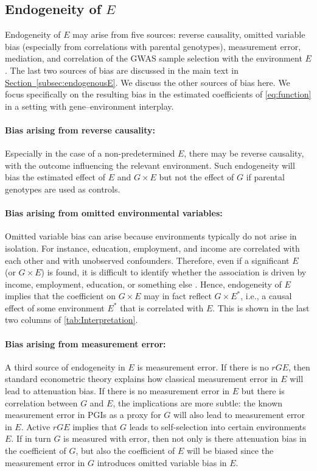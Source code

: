 \documentclass[12pt,a4paper]{article}
\begin{document}
\begin{bibunit}
\subsection{Endogeneity of \texorpdfstring{$E$}{}}
Endogeneity of $E$ may arise from five sources: reverse causality, omitted variable bias (especially from correlations with parental genotypes), measurement error, mediation, and correlation of the GWAS sample selection with the environment $E$. The last two sources of bias are discussed in the main text in \hyperref[subsec:endogenousE]{Section~\ref*{subsec:endogenousE}}. We discuss the other sources of bias here. We focus specifically on the resulting bias in the estimated coefficients of \autoref{eq:function} in a setting with gene--environment interplay. 

\paragraph{Bias arising from reverse causality:}
Especially in the case of a non-predetermined $E$, there may be reverse causality, with the outcome influencing the relevant environment. Such endogeneity will bias the estimated effect of $E$ and $G \times E$ but not the effect of $G$ if parental genotypes are used as controls. 

\paragraph{Bias arising from omitted environmental variables:}
Omitted variable bias can arise because environments typically do not arise in isolation. For instance, education, employment, and income are correlated with each other and with unobserved confounders. Therefore, even if a significant $E$ (or $G \times E$) is found, it is difficult to identify whether the association is driven by income, employment, education, or something else  \citep{Boardman2013}. Hence, endogeneity of $E$ implies that the coefficient on $G \times E$ may in fact reflect $G \times E^*$, i.e., a causal effect of some environment $E^*$ that is correlated with $E$. This is shown in the last two columns of \autoref{tab:Interpretation}. 

\paragraph{Bias arising from measurement error:}
A third source of endogeneity in $E$ is measurement error. If there is no $rGE$, then standard econometric theory explains how classical measurement error in $E$ will lead to attenuation bias. If there is no measurement error in $E$ but there is correlation between $G$ and $E$, the implications are more subtle: the known measurement error in PGIs as a proxy for $G$ will also lead to measurement error in $E$. Active $rGE$ implies that $G$ leads to self-selection into certain environments $E$. If in turn $G$ is measured with error, then not only is there attenuation bias in the coefficient of $G$, but also the coefficient of $E$ will be biased since the measurement error in $G$ introduces omitted variable bias in $E$.


\end{bibunit}
\end{document}
